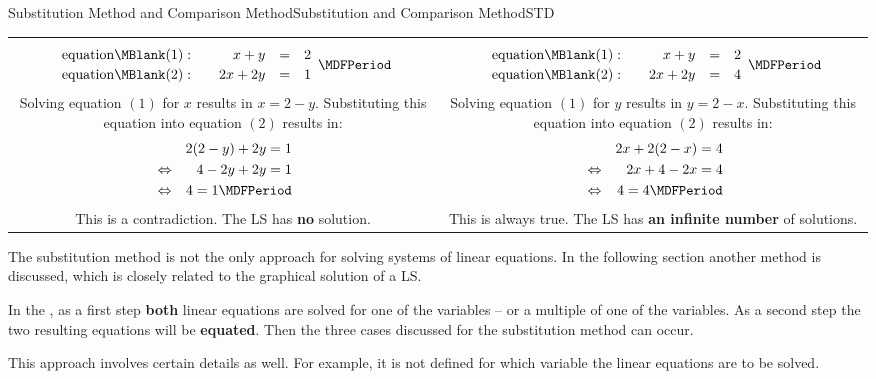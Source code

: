 \begin{MXContent}{Substitution Method and Comparison Method}{Substitution and Comparison Method}{STD}
\begin{MExample}
\begin{center}
\begin{tabular}{c|c}
\begin{minipage}[t]{7.5cm}
$$\begin{array}{rcrcl} \mbox{equation}\MBlank (1): & & x + y & = & 2 \\[.5ex]
\mbox{equation}\MBlank (2): & & 2 x + 2 y & = & 1 \end{array}\MDFPeriod $$
Solving equation $(1)$ for $x$ results in $x = 2 - y$.
Substituting this equation into equation $(2)$ results in:
\begin{eqnarray*}
& & 2 (2 - y) + 2y = 1 \\
& \Leftrightarrow & 4 - 2y + 2y = 1 \\
& \Leftrightarrow & 4 = 1\MDFPeriod 
\end{eqnarray*}
This is a contradiction. The LS has \textbf{no} solution.
\end{minipage} &
\begin{minipage}[t]{7.5cm}
$$\begin{array}{rcrcl} \mbox{equation}\MBlank (1): & & x + y & = & 2 \\[.5ex]
\mbox{equation}\MBlank (2): & & 2 x + 2 y & = & 4 \end{array}\MDFPeriod $$
Solving equation $(1)$ for $y$ results in $y = 2 - x$.
Substituting this equation into equation $(2)$ results in:
\begin{eqnarray*}
& & 2x + 2 (2 - x) = 4 \\
& \Leftrightarrow & 2x + 4 - 2x = 4 \\
& \Leftrightarrow & 4 = 4\MDFPeriod 
\end{eqnarray*}
This is always true. The LS has \textbf{an infinite number} of solutions.
\end{minipage}
\end{tabular}
\end{center}
\end{MExample}
The substitution method is not the only approach for solving systems of linear 
equations. In the following section another method is discussed, which is closely related 
to the graphical solution of a LS.

\begin{MInfo}
In the  , as a first step \textbf{both} 
linear equations are solved for one of the variables -- or a multiple of one of 
the variables. As a second step the two resulting equations will be \textbf{equated}. 
Then the three cases discussed for the substitution method can occur. 
\end{MInfo}
This approach involves certain details as well. For example, it is not
defined for which variable the linear equations are to be solved.


\end{MXContent}
